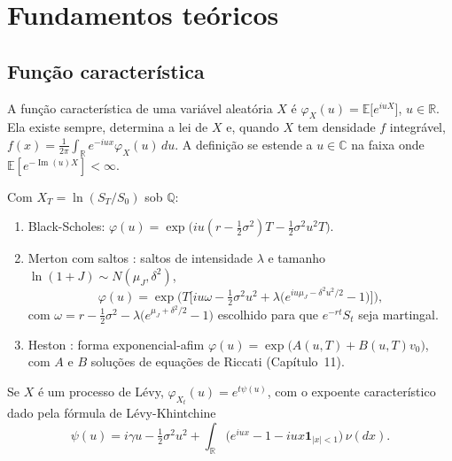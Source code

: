 \section{Fundamentos teóricos}

\subsection{Função característica}

\begin{definicao}
A função característica de uma variável aleatória $X$ é $\varphi_X(u)=\mathbb E\big[e^{iuX}\big]$, $u\in\mathbb R$. Ela existe sempre, determina a lei de $X$ e, quando $X$ tem densidade $f$ integrável, $f(x)=\frac1{2\pi}\int_{\mathbb R}e^{-iux}\varphi_X(u)\,du$. A definição se estende a $u\in\mathbb C$ na faixa onde $\mathbb E[e^{-\operatorname{Im}(u)X}]<\infty$.
\end{definicao}

\begin{exemplo}
Com $X_T=\ln(S_T/S_0)$ sob $\mathbb Q$:
\begin{enumerate}
\item Black-Scholes: $\varphi(u)=\exp\big(iu(r-\tfrac12\sigma^2)T-\tfrac12\sigma^2u^2T\big)$.
\item Merton com saltos \citep{merton1976}: saltos de intensidade $\lambda$ e tamanho $\ln(1+J)\sim N(\mu_J,\delta^2)$,
\begin{equation}\label{eq:cf-merton}
\varphi(u)=\exp\Big(T\Big[iu\omega-\tfrac12\sigma^2u^2+\lambda\big(e^{iu\mu_J-\delta^2u^2/2}-1\big)\Big]\Big),
\end{equation}
com $\omega=r-\tfrac12\sigma^2-\lambda\big(e^{\mu_J+\delta^2/2}-1\big)$ escolhido para que $e^{-rt}S_t$ seja martingal.
\item Heston \citep{heston1993}: forma exponencial-afim $\varphi(u)=\exp\big(A(u,T)+B(u,T)v_0\big)$, com $A$ e $B$ soluções de equações de Riccati (Capítulo~11).
\end{enumerate}
\end{exemplo}

\begin{teorema}
Se $X$ é um processo de Lévy, $\varphi_{X_t}(u)=e^{t\psi(u)}$, com o expoente característico dado pela fórmula de Lévy-Khintchine
\begin{equation}
\psi(u)=i\gamma u-\tfrac12\sigma^2u^2+\int_{\mathbb R}\big(e^{iux}-1-iux\mathbf 1_{|x|<1}\big)\,\nu(dx).
\end{equation}
\end{teorema}

